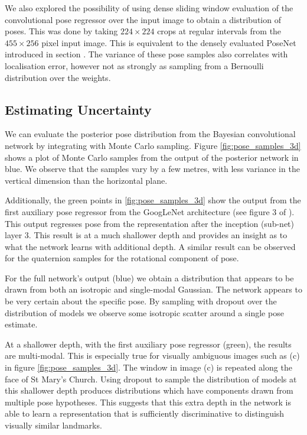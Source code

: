 We also explored the possibility of using dense sliding window evaluation of the convolutional pose regressor over the input image to obtain a distribution of poses. This was done by taking $224\times224$ crops at regular intervals from the $455\times256$ pixel input image. This is equivalent to the densely evaluated PoseNet introduced in section \citep{kendall2015posenet}. The variance of these pose samples also correlates with localisation error, however not as strongly as sampling from a Bernoulli distribution over the weights.

\subsection{Estimating Uncertainty}

We can evaluate the posterior pose distribution from the Bayesian convolutional network by integrating with Monte Carlo sampling. Figure \ref{fig:pose_samples_3d} shows a plot of Monte Carlo samples from the output of the posterior network in blue. We observe that the samples vary by a few metres, with less variance in the vertical dimension than the horizontal plane.

Additionally, the green points in \ref{fig:pose_samples_3d} show the output from the first auxiliary pose regressor from the GoogLeNet architecture (see figure 3 of \citep{szegedy2014going}). This output regresses pose from the representation after the inception (sub-net) layer 3. This result is at a much shallower depth and provides an insight as to what the network learns with additional depth. A similar result can be observed for the quaternion samples for the rotational component of pose.

For the full network's output (blue) we obtain a distribution that appears to be drawn from both an isotropic and single-modal Gaussian. The network appears to be very certain about the specific pose. By sampling with dropout over the distribution of models we observe some isotropic scatter around a single pose estimate.

At a shallower depth, with the first auxiliary pose regressor (green), the results are multi-modal. This is especially true for visually ambiguous images such as (c) in figure \ref{fig:pose_samples_3d}. The window in image (c) is repeated along the face of St Mary's Church. Using dropout to sample the distribution of models at this shallower depth produces distributions which have components drawn from multiple pose hypotheses. This suggests that this extra depth in the network is able to learn a representation that is sufficiently discriminative to distinguish visually similar landmarks.

